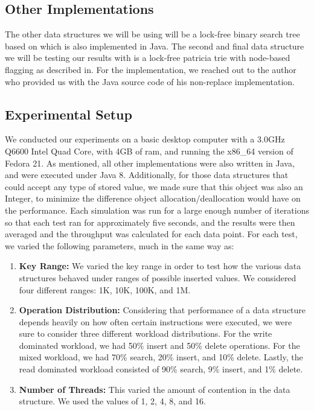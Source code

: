 \documentclass[conference]{IEEEtran}
\begin{document}
\subsection{Other Implementations}
The other data structures we will be using will be a lock-free binary search tree based on\cite{Natarajan2014} which is also implemented in Java\cite{LFBST}. The second and final data structure we will be testing our results with is a lock-free patricia trie with node-based flagging as described in\cite{Shafiei2013}. For the implementation, we reached out to the author who provided us with the Java source code of his non-replace implementation.

\subsection{Experimental Setup}
We conducted our experiments on a basic desktop computer with a 3.0GHz Q6600 Intel Quad Core, with 4GB of ram, and running the x86\_64 version of Fedora 21. As mentioned, all other implementations were also written in Java, and were executed under Java 8. Additionally, for those data structures that could accept any type of stored value, we made sure that this object was also an Integer, to minimize the difference object allocation/deallocation would have on the performance. Each simulation was run for a large enough number of iterations so that each test ran for approximately five seconds, and the results were then averaged and the throughput was calculated for each data point. For each test, we varied the following parameters, much in the same way as\cite{Natarajan2014}:

\begin{enumerate}
  \item \textbf{Key Range:} We varied the key range in order to test how the various data structures behaved under ranges of possible inserted values. We considered four different ranges: 1K, 10K, 100K, and 1M.
  \item \textbf{Operation Distribution:} Considering that performance of a data structure depends heavily on how often certain instructions were executed, we were sure to consider three different workload distributions. For the write dominated workload, we had 50\% insert and 50\% delete operations. For the mixed workload, we had 70\% search, 20\% insert, and 10\% delete. Lastly, the read dominated workload consisted of 90\% search, 9\% insert, and 1\% delete.
  \item \textbf{Number of Threads:} This varied the amount of contention in the data structure. We used the values of 1, 2, 4, 8, and 16.
\end{enumerate}
\end{document}
